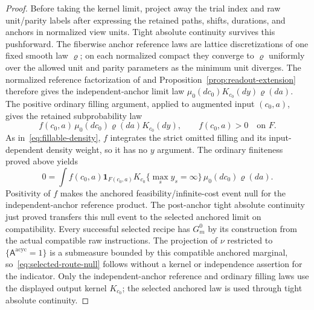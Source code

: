 \begin{proof}
Before taking the kernel limit, project away the trial index and
raw unit/parity labels after expressing the retained paths, shifts,
durations, and anchors in normalized view units.  Tight absolute
continuity survives this pushforward.  The fiberwise anchor reference laws
are lattice discretizations of one fixed smooth law \(\varrho\);
on each normalized compact they converge to \(\varrho\) uniformly
over the allowed unit and parity parameters as the minimum unit
diverges.  The normalized reference factorization of
\cite[Theorem~7.10]{P} and Proposition~\ref{prop:readout-extension}
therefore gives the independent-anchor limit law
\(\mu_0(dc_0)K_{c_0}(dy)\varrho(da)\).  The positive ordinary
filling argument, applied to augmented input \((c_0,a)\), gives
the retained subprobability law
\[
 f(c_0,a)\,\mu_0(dc_0)\varrho(da)K_{c_0}(dy),
 \qquad f(c_0,a)>0\quad\text{on }F.
\]
As in~\eqref{eq:fillable-density}, \(f\) integrates the strict
omitted filling and its input-dependent density weight, so it has
no \(y\) argument.  The ordinary finiteness proved above yields
\[
 0=\int f(c_0,a)\mathbf1_{F(c_0,a)}
 K_{c_0}\{\max_s y_s=\infty\}\,
 \mu_0(dc_0)\varrho(da).
\]
Positivity of \(f\) makes the anchored feasibility/infinite-cost
event null for the independent-anchor reference product.
The post-anchor tight absolute continuity just proved transfers
this null event to the selected anchored limit on compatibility.
Every successful selected recipe has \(G_m^0\) by its construction
from the actual compatible raw instructions.
The projection of \(\nu\) restricted to
\(\{\mathsf A^{\mathrm{acyc}}=1\}\) is a submeasure bounded by this
compatible anchored marginal, so~\eqref{eq:selected-route-null}
follows without a kernel or independence assertion for the indicator.
Only the independent-anchor reference and ordinary filling laws
use the displayed output kernel \(K_{c_0}\); the selected anchored
law is used through tight absolute continuity.


\end{proof}
